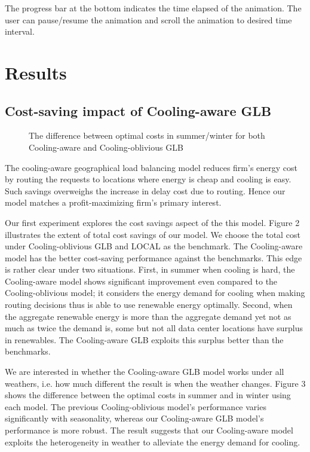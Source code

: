 \documentclass{acm_proc_article-sp}
\begin{document}
The progress bar at the bottom indicates the time elapsed of the animation. The user can pause/resume the animation and scroll the animation to desired time interval.


\section{Results}
\subsection{Cost-saving impact of Cooling-aware GLB}

\begin{figure}
\centering
{}
\caption{The difference between optimal costs in summer/winter for both Cooling-aware and Cooling-oblivious GLB}
\end{figure}

The cooling-aware geographical load balancing model reduces firm's energy cost by routing the requests to locations where energy is cheap and cooling is easy. Such savings overweighs the increase in delay cost due to routing. Hence our model matches a profit-maximizing firm's primary interest.  


Our first experiment explores the cost savings aspect of the this model. Figure 2 illustrates the extent of total cost savings of our model. We choose the total cost under Cooling-oblivious GLB and LOCAL as the benchmark. The Cooling-aware model has the better cost-saving performance against the benchmarks. This edge is rather clear under two situations. First, in summer when cooling is hard, the Cooling-aware model shows significant improvement even compared to the Cooling-oblivious model; it considers the energy demand for cooling when making routing decisions thus is able to use renewable energy optimally. Second, when the aggregate renewable energy is more than the aggregate demand yet not as much as twice the demand is, some but not all data center locations have surplus in renewables. The Cooling-aware GLB exploits this surplus better than the benchmarks.

We are interested in whether the Cooling-aware GLB model works under all weathers, i.e. how much different the result is when the weather changes. Figure 3 shows the difference between the optimal costs in summer and in winter using each model. The previous Cooling-oblivious model's performance varies significantly with seasonality, whereas our Cooling-aware GLB model's performance is more robust. The result suggests that our Cooling-aware model exploits the heterogeneity in weather to alleviate the energy demand for cooling.    
\end{document}
